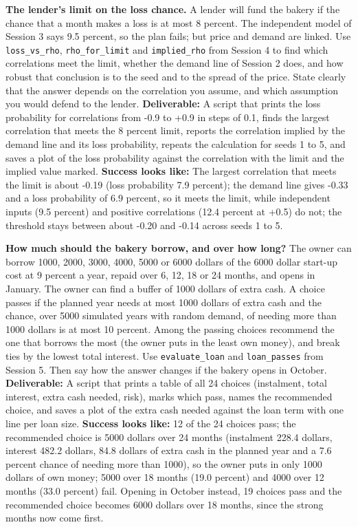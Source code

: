 \documentclass[11pt,a4paper]{article}
\begin{document}
\textbf{The lender's limit on the loss chance.} A lender will fund the bakery if the chance that a month makes a loss is at most 8 percent. The independent model of Session 3 says 9.5 percent, so the plan fails; but price and demand are linked. Use \texttt{loss\_vs\_rho}, \texttt{rho\_for\_limit} and \texttt{implied\_rho} from Session 4 to find which correlations meet the limit, whether the demand line of Session 2 does, and how robust that conclusion is to the seed and to the spread of the price. State clearly that the answer depends on the correlation you assume, and which assumption you would defend to the lender. \textbf{Deliverable:} A script that prints the loss probability for correlations from -0.9 to +0.9 in steps of 0.1, finds the largest correlation that meets the 8 percent limit, reports the correlation implied by the demand line and its loss probability, repeats the calculation for seeds 1 to 5, and saves a plot of the loss probability against the correlation with the limit and the implied value marked. \textbf{Success looks like:} The largest correlation that meets the limit is about -0.19 (loss probability 7.9 percent); the demand line gives -0.33 and a loss probability of 6.9 percent, so it meets the limit, while independent inputs (9.5 percent) and positive correlations (12.4 percent at +0.5) do not; the threshold stays between about -0.20 and -0.14 across seeds 1 to 5.

\textbf{How much should the bakery borrow, and over how long?} The owner can borrow 1000, 2000, 3000, 4000, 5000 or 6000 dollars of the 6000 dollar start-up cost at 9 percent a year, repaid over 6, 12, 18 or 24 months, and opens in January. The owner can find a buffer of 1000 dollars of extra cash. A choice passes if the planned year needs at most 1000 dollars of extra cash and the chance, over 5000 simulated years with random demand, of needing more than 1000 dollars is at most 10 percent. Among the passing choices recommend the one that borrows the most (the owner puts in the least own money), and break ties by the lowest total interest. Use \texttt{evaluate\_loan} and \texttt{loan\_passes} from Session 5. Then say how the answer changes if the bakery opens in October. \textbf{Deliverable:} A script that prints a table of all 24 choices (instalment, total interest, extra cash needed, risk), marks which pass, names the recommended choice, and saves a plot of the extra cash needed against the loan term with one line per loan size. \textbf{Success looks like:} 12 of the 24 choices pass; the recommended choice is 5000 dollars over 24 months (instalment 228.4 dollars, interest 482.2 dollars, 84.8 dollars of extra cash in the planned year and a 7.6 percent chance of needing more than 1000), so the owner puts in only 1000 dollars of own money; 5000 over 18 months (19.0 percent) and 4000 over 12 months (33.0 percent) fail. Opening in October instead, 19 choices pass and the recommended choice becomes 6000 dollars over 18 months, since the strong months now come first.
\end{document}
